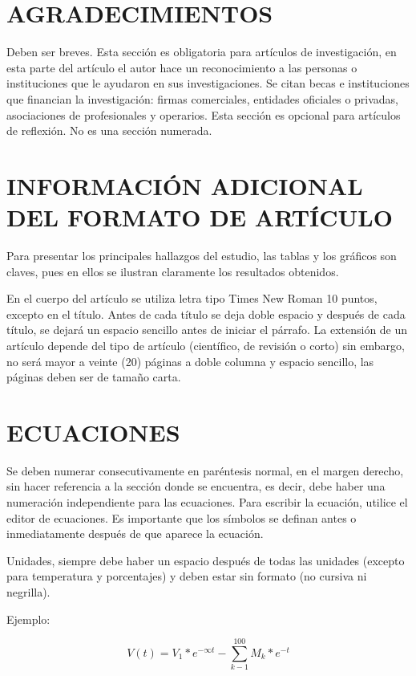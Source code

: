 \documentclass[twocolumn,10pt]{article}
\begin{document}
\section{AGRADECIMIENTOS}

Deben ser breves. Esta sección es obligatoria para artículos de investigación, en esta parte del artículo el autor hace un reconocimiento a las personas o instituciones que le ayudaron en sus investigaciones.  Se citan becas e instituciones que financian la investigación: firmas comerciales, entidades oficiales o privadas, asociaciones de profesionales y operarios.  Esta sección es opcional para artículos de reflexión. No es una sección numerada.

\section*{INFORMACIÓN ADICIONAL DEL FORMATO DE ARTÍCULO}

Para presentar los principales hallazgos del estudio, las tablas y los gráficos son claves, pues en ellos se ilustran claramente los resultados obtenidos.

En el cuerpo del artículo se utiliza letra tipo Times New Roman 10 puntos, excepto en el título. Antes de cada título se deja doble espacio y después de cada título, se dejará un espacio sencillo antes de iniciar el párrafo. La extensión de un artículo depende del tipo de artículo (científico, de revisión o corto) sin embargo, no será mayor a veinte (20) páginas a doble columna y espacio sencillo, las páginas deben ser de tamaño carta.

\section*{ECUACIONES}

Se deben numerar consecutivamente en paréntesis normal, en el margen derecho, sin hacer referencia a la sección donde se encuentra, es decir, debe haber una numeración independiente para las ecuaciones.  Para escribir la ecuación, utilice el editor de ecuaciones.  Es importante que los símbolos se definan antes o inmediatamente después de que aparece la ecuación.

Unidades, siempre debe haber un espacio después de todas las unidades (excepto para temperatura y porcentajes) y deben estar sin formato (no cursiva ni negrilla).

Ejemplo:

\begin{equation}
V(t) = V_{1}*e^{-\infty t } - \sum_{k-1}^{100}M_{k}*e^{-t}
\end{equation}
\end{document}
